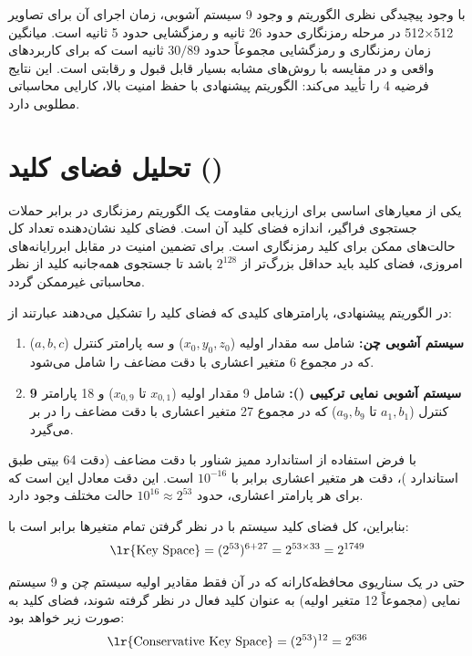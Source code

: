 با وجود پیچیدگی نظری الگوریتم و وجود 9 سیستم آشوبی، زمان اجرای آن برای تصاویر 512×512 در مرحله رمزنگاری حدود 26 ثانیه و رمزگشایی حدود 5 ثانیه است. میانگین زمان رمزنگاری و رمزگشایی مجموعاً حدود $30/89$ ثانیه است که برای کاربردهای واقعی و در مقایسه با روش‌های مشابه بسیار قابل قبول و رقابتی است. این نتایج فرضیه 4 را تأیید می‌کند: الگوریتم پیشنهادی با حفظ امنیت بالا، کارایی محاسباتی مطلوبی دارد.

\section{تحلیل فضای کلید ()}
یکی از معیارهای اساسی برای ارزیابی مقاومت یک الگوریتم رمزنگاری در برابر حملات جستجوی فراگیر، اندازه فضای کلید آن است. فضای کلید نشان‌دهنده تعداد کل حالت‌های ممکن برای کلید رمزنگاری است. برای تضمین امنیت در مقابل ابررایانه‌های امروزی، فضای کلید باید حداقل بزرگ‌تر از $2^{128}$ باشد تا جستجوی همه‌جانبه کلید از نظر محاسباتی غیرممکن گردد.

در الگوریتم پیشنهادی، پارامترهای کلیدی که فضای کلید را تشکیل می‌دهند عبارتند از:
\begin{enumerate}
    \item \textbf{سیستم آشوبی چن:} شامل سه مقدار اولیه ($x_0, y_0, z_0$) و سه پارامتر کنترل ($a, b, c$) که در مجموع 6 متغیر اعشاری با دقت مضاعف را شامل می‌شود.
    \item \textbf{9 سیستم آشوبی نمایی ترکیبی ():} شامل 9 مقدار اولیه ($x_{0,1}$ تا $x_{0,9}$) و 18 پارامتر کنترل ($a_1, b_1$ تا $a_9, b_9$) که در مجموع 27 متغیر اعشاری با دقت مضاعف را در بر می‌گیرد.
\end{enumerate}

با فرض استفاده از استاندارد ممیز شناور با دقت مضاعف (دقت 64 بیتی طبق استاندارد )، دقت هر متغیر اعشاری برابر با $10^{-16}$ است. این دقت معادل این است که برای هر پارامتر اعشاری، حدود $10^{16} \approx 2^{53}$ حالت مختلف وجود دارد.

بنابراین، کل فضای کلید سیستم با در نظر گرفتن تمام متغیرها برابر است با:
\begin{equation}
\text{\lr{Key Space}} = (2^{53})^{6 + 27} = 2^{53 \times 33} = 2^{1749}
\end{equation}

حتی در یک سناریوی محافظه‌کارانه که در آن فقط مقادیر اولیه سیستم چن و 9 سیستم نمایی (مجموعاً 12 متغیر اولیه) به عنوان کلید فعال در نظر گرفته شوند، فضای کلید به صورت زیر خواهد بود:
\begin{equation}
\text{\lr{Conservative Key Space}} = (2^{53})^{12} = 2^{636}
\end{equation}

